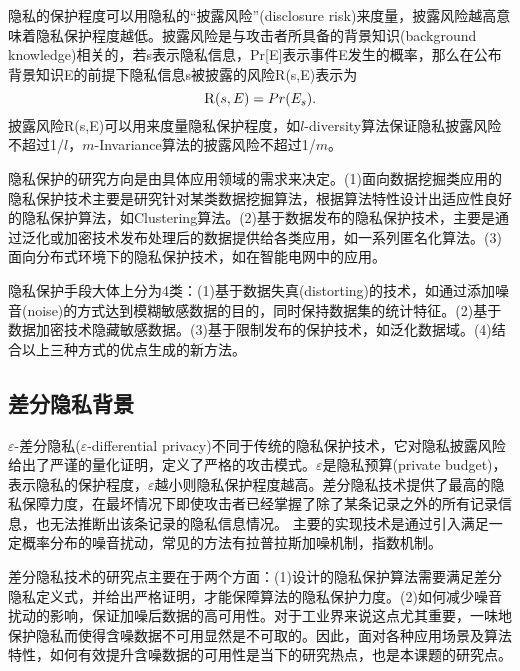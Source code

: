 隐私的保护程度可以用隐私的“披露风险”(disclosure risk)\supercite{l-diversity}来度量，披露风险越高意味着隐私保护程度越低。披露风险是与攻击者所具备的背景知识(background knowledge)\supercite{compounding-attack,background-attack}相关的，若s表示隐私信息，Pr[E]表示事件E发生的概率，那么在公布背景知识E的前提下隐私信息s被披露的风险\textsc{R}(s,E)\supercite{dp-summary}表示为
\[
	\textsc{R}(s,E) = Pr(E_{s}).
\]
披露风险\textsc{R}(s,E)可以用来度量隐私保护程度，如$l$-diversity算法\supercite{l-diversity}保证隐私披露风险不超过1/$l$，$m$-Invariance算法\cite{m-Invariance}的披露风险不超过1/$m$。

隐私保护的研究方向是由具体应用领域的需求来决定。(1)面向数据挖掘类应用的隐私保护技术主要是研究针对某类数据挖掘算法，根据算法特性设计出适应性良好的隐私保护算法，如Clustering\supercite{clustering}算法。(2)基于数据发布的隐私保护技术，主要是通过泛化或加密技术发布处理后的数据提供给各类应用，如一系列匿名化算法\supercite{multidimensional-k-anonymity,closeness}。(3)面向分布式环境下的隐私保护技术，如在智能电网中的应用\supercite{Distributed-Privacy}。

隐私保护手段大体上分为4类：(1)基于数据失真(distorting)的技术\supercite{distortion}，如通过添加噪音(noise)的方式达到模糊敏感数据的目的，同时保持数据集的统计特征。(2)基于数据加密技术隐藏敏感数据\supercite{secret}。(3)基于限制发布的保护技术，如泛化数据域\supercite{generalization}。(4)结合以上三种方式的优点生成的新方法。


\subsection{差分隐私背景} %

$\varepsilon$-差分隐私($\varepsilon$-differential privacy)\supercite{Dwork-Calibrating,dwork1,dwork2}不同于传统的隐私保护技术，它对隐私披露风险给出了严谨的量化证明，定义了严格的攻击模式。$\varepsilon$是隐私预算(private budget)，表示隐私的保护程度，$\varepsilon$越小则隐私保护程度越高。差分隐私技术提供了最高的隐私保障力度，在最坏情况下即使攻击者已经掌握了除了某条记录之外的所有记录信息，也无法推断出该条记录的隐私信息情况。
主要的实现技术是通过引入满足一定概率分布的噪音扰动，常见的方法有拉普拉斯加噪机制\supercite{Dwork-Calibrating}，指数机制\supercite{2007mechanism}。

差分隐私技术的研究点主要在于两个方面：(1)设计的隐私保护算法需要满足差分隐私定义式，并给出严格证明，才能保障算法的隐私保护力度。(2)如何减少噪音扰动的影响，保证加噪后数据的高可用性。对于工业界来说这点尤其重要，一味地保护隐私而使得含噪数据不可用显然是不可取的。因此，面对各种应用场景及算法特性，如何有效提升含噪数据的可用性是当下的研究热点，也是本课题的研究点。


